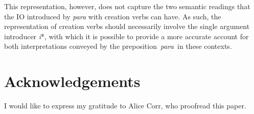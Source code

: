 \documentclass[output=paper,colorlinks,citecolor=brown,nonflat]{./langscibook}
\begin{document}
This representation, however, does not capture the two semantic readings that the IO introduced by \textit{para} with creation verbs can have. As such, the representation of creation verbs should necessarily involve the single argument introducer \textit{i}*, with which it is possible to provide a more accurate account for both interpretations conveyed by the preposition~\textit{para~}in these contexts.

\section*{Acknowledgements}
I would like to express my gratitude to Alice Corr, who proofread this paper.

\sloppy\printbibliography[heading=subbibliography,notkeyword=this]
\end{document}
